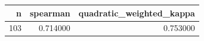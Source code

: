 \begin{tabular}{rrr}
\toprule
n & spearman & quadratic_weighted_kappa \\
\midrule
103 & 0.714000 & 0.753000 \\
\bottomrule
\end{tabular}
